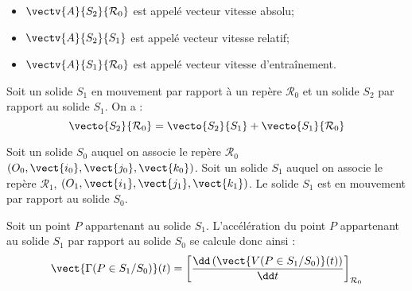 \begin{remarque}
\begin{itemize}
\item $\vectv{A}{S_2}{\mathcal{R}_0}$ est appelé vecteur vitesse absolu;
\item $\vectv{A}{S_2}{S_1}$ est appelé vecteur vitesse relatif; 
\item $\vectv{A}{S_1}{\mathcal{R}_0}$ est appelé vecteur vitesse d'entraînement.
\end{itemize}
\end{remarque}

\begin{resultat}

Soit un solide $S_1$ en mouvement par rapport à un repère $\mathcal{R}_0$ et un solide $S_2$ par rapport au solide $S_1$. On a : 
$$
\vecto{S_2}{\mathcal{R}_0}=
\vecto{S_2}{S_1}+\vecto{S_1}{\mathcal{R}_0}
$$
\end{resultat}

\begin{defi}

Soit un solide $S_0$ auquel on associe le repère $\mathcal{R}_0$ $\left(O_0,\vect{i_0},\vect{j_0},\vect{k_0} \right)$.  Soit un solide $S_1$ auquel on associe le repère $\mathcal{R}_1$,  $\left(O_1,\vect{i_1},\vect{j_1},\vect{k_1} \right)$. Le solide $S_1$ est en mouvement par rapport au solide $S_0$. 


Soit un point $P$ appartenant au solide $S_1$. L'accélération du point $P$ appartenant au solide $S_1$ par rapport au solide $S_0$ se calcule donc ainsi : 
$$
\vect{\Gamma(P\in S_1/S_0)}(t) = \left[\dfrac{\dd \left( \vect{V(P\in S_1/S_0)}(t)\right)}{\dd t}\right]_{\mathcal{R}_0}
$$

\end{defi}

